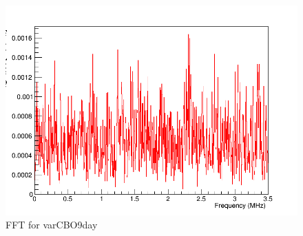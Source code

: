 \begin{figure}[!h]
\centering 
\includegraphics[scale=0.5]{Figures/varCBO9day_fft.png}
\decoRule
\caption{FFT for varCBO9day}
\label{fig:varCBO9day_fft}
\end{figure}


